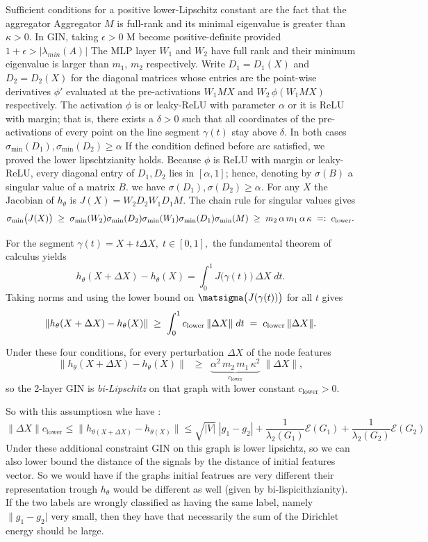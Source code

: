\documentclass[11pt]{article}\usepackage{amsmath,amssymb,amsthm,bbm}
\newcommand{\EE}{\mathcal{E}}
\newcommand{\1}{\mathbbm{1}}
\begin{document}
Sufficient conditions for a positive lower-Lipschitz constant are the fact that the aggregator 
Aggregator \(M\) is full-rank and its minimal eigenvalue is greater than  \(\kappa>0\). In GIN, taking $\epsilon>0$ M become positive-definite provided $1+ \epsilon > | \lambda_{min}(A)|$
The MLP layer \(W_1\) and \( W_2 \) have full rank and their minimum eigenvalue is larger than $m_1$, $m_2$ respectively.  Write \(D_1=D_1(X)\) and \(D_2=D_2(X)\) for the diagonal matrices whose
entries are the point-wise derivatives \(\phi'\) evaluated at the pre-activations
\(W_1 M X\) and \(W_2\,\phi(W_1 M X)\) respectively.
The activation \(\phi\) is or leaky-ReLU with parameter $\alpha$ or it is ReLU with margin; that is, there exists a $\delta>0$ such that all coordinates of the pre-activations of every point on the line segment $\gamma(t)$ stay above $\delta$. In both cases $\sigma_{\min} (D_1), \sigma_{\min}(D_2) \geq \alpha $ 
If the condition defined before are satisfied, we proved the lower lipschtzianity holds.
Because \(\phi\) is ReLU with margin or leaky-ReLU, every diagonal entry
of \(D_1,D_2\) lies in \([\alpha,1]\); hence, denoting by $\sigma(B)$ a singular value of a matrix $B$.
we have \(\sigma (D_1),\sigma(D_2)\ge\alpha\).
For any \(X\) the Jacobian of \(h_{\theta}\) is
\(J(X)=W_2 D_2 W_1 D_1 M\).
The chain rule for singular values gives
\[
\sigma_{\min}\bigl(J(X)\bigr)
\;\ge\;
\sigma_{\min}(W_2)
\sigma_{\min}(D_2)
\sigma_{\min}(W_1)
\sigma_{\min}(D_1)
\sigma_{\min}(M)
\;\ge\;
m_2\,\alpha\,m_1\,\alpha\,\kappa
\;=:\;
c_{\textnormal{lower}} .
\]

\medskip\noindent
For the segment
\(
\gamma(t)=X+t\Delta X,\;t\in[0,1],
\)
the fundamental theorem of calculus yields
\[
h_{\theta}(X+\Delta X)-h_{\theta}(X)
   =\int_{0}^{1} J\!\bigl(\gamma(t)\bigr)\,\Delta X\;dt .
\]
Taking norms and using the lower bound on \(\matsigma\bigl(J(\gamma(t))\bigr)\)
for all \(t\) gives
\[
\|{h_{\theta}(X+\Delta X)-h_{\theta}(X)}\|
   \;\ge\;
\int_{0}^{1} c_{\textnormal{lower}}\,
           \| {\Delta X} \| \;dt
   \;=\;
c_{\textnormal{lower}}\,
\| {\Delta X} \|.
\]


\bigskip
Under these four conditions, for every perturbation \(\Delta X\) of the node features
\[
\| {h_{\theta}(X+\Delta X)-h_{\theta}(X)}\|
\;\;\ge\;\;
\underbrace{\alpha^{2}\,m_{2}\,m_{1}\,\kappa^{2}}_{\displaystyle c_{\text{lower}}}
\;\|\Delta X\|,
\]
so the 2-layer GIN is \emph{bi-Lipschitz} on that graph with lower constant
\(c_{\text{lower}}>0\).


So with this assumptiosn whe have : 
\[ \| \Delta X\| c_{\text{lower}} \le \| h_{\theta( X +  \Delta X )} - h_{\theta( X)}   \| \le \sqrt{|V|}  \; |  g_1 -  g_2| + \frac{1}{\lambda_2(G_1)} \EE(G_1)  + \frac{1}{\lambda_2(G_2)} \EE(G_2) \]
Under these additional constraint GIN on this graph is lower lipsichtz, so we  can also lower bound the distance of the signals by the distance of initial features vector. So we would have if the graphs initial featrues are very different their representation trough $h_{\theta}$ would be different as well (given by bi-lispicithzianity). If the two labels are wrongly classified as having the same label, namely $\| g_1 - g_2| $ very small, then they have that necessarily the sum of the Dirichlet energy should be large. 
\end{document}
